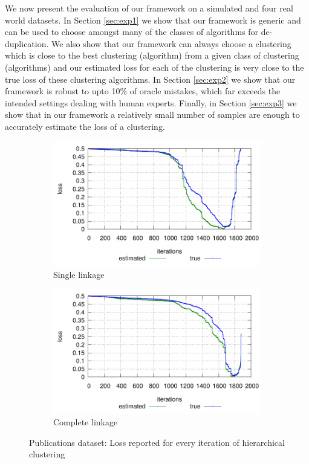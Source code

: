 \documentclass[12pt]{article}
\begin{document}
We now present the evaluation of our framework on a simulated and four real world datasets.
In Section \ref{sec:exp1} we show that our framework is generic and can be used to choose amongst many of the classes of algorithms for de-duplication. We also show that our framework can always choose a clustering which is close to the best clustering (algorithm) from a given class of clustering (algorithms) and our estimated loss for each of the clustering is very close to the true loss of these clustering algorithms.
In Section \ref{sec:exp2} we show that our framework is robust to upto 10\% of oracle mistakes, which far exceeds the intended settings dealing with human experts.
Finally, in Section \ref{sec:exp3} we show that in our framework a relatively small number of samples are enough to accurately estimate the loss of a clustering.

\begin{figure}[!ht]
    \centering
    \begin{subfigure}[b]{0.75\textwidth}
        \centering
        \includegraphics[width=\linewidth]{figures/deDuplication/plot_real_s.pdf}
        \caption{Single linkage}
    \end{subfigure}%
    
    \begin{subfigure}[b]{0.75\textwidth}
        \centering
        \includegraphics[scale=0.5,width=\linewidth]{figures/deDuplication/plot_real_c.pdf}
        \caption{Complete linkage}
    \end{subfigure}
	\caption{Publications dataset: Loss reported for every iteration of hierarchical clustering}
    \label{fig:publications}
\end{figure}
\end{document}
